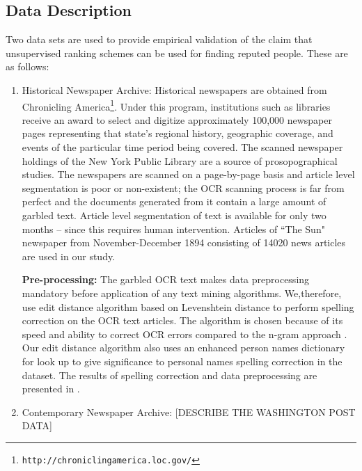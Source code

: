 \documentclass[a4paper,man,natbib]{apa6}
\begin{document}
\subsection{Data Description}
\label{data}
Two data sets are used to provide empirical validation of the claim that unsupervised ranking schemes can be used for finding reputed people. These are as follows:

\begin{enumerate}
\item Historical Newspaper Archive: Historical newspapers are obtained from Chronicling America\footnote{\texttt{http://chroniclingamerica.loc.gov/}}. Under this program, institutions such as libraries receive an award to select and digitize approximately 100,000 newspaper pages representing that state's regional history, geographic coverage, and events of the particular time period being covered. The scanned newspaper holdings of the New York Public Library are a source of prosopographical studies. The newspapers are scanned on a page-by-page basis and article level
segmentation is poor or non-existent; the OCR scanning process is far
from perfect and the documents generated from it contain a large
amount of garbled text. Article level segmentation of text is available for only two months -- since this requires human intervention. Articles of ``The Sun" newspaper from November-December 1894 consisting of 14020 news articles are used in our study. 

\textbf{Pre-processing: } The garbled OCR text makes data preprocessing mandatory before application of any text mining algorithms. We,therefore, use edit distance algorithm based on Levenshtein distance to perform spelling correction on the OCR text articles. The algorithm is chosen because of its speed and ability to correct OCR errors compared to the n-gram approach \cite{chattopadhyaya2013fast}. Our edit distance algorithm also uses an enhanced person names dictionary for look up to give significance to personal names spelling correction in the dataset. The results of spelling correction and data preprocessing are presented in \cite{Gupta_14a}.


\item Contemporary Newspaper Archive: [DESCRIBE THE WASHINGTON POST DATA]
\end{enumerate}

\end{document}
